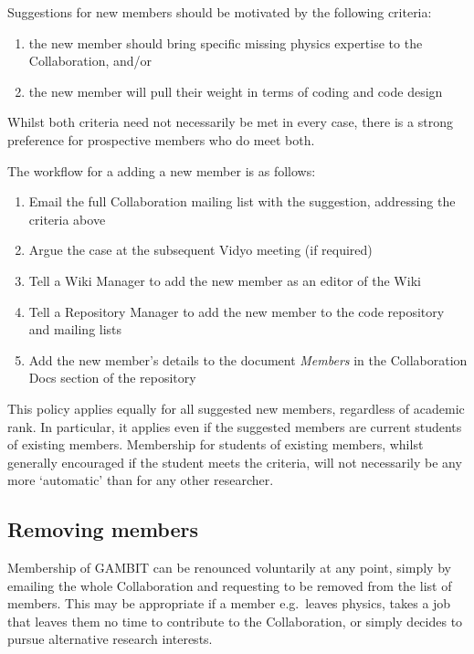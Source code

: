 Suggestions for new members should be motivated by the following criteria:
\begin{enumerate}
\item the new member should bring specific missing physics expertise to the Collaboration, and/or
\item the new member will pull their weight in terms of coding and code design
\end{enumerate}
Whilst both criteria need not necessarily be met in every case, there is a strong preference for prospective members who do meet both.  

The workflow for a adding a new member is as follows:
\begin{enumerate}
\item Email the full Collaboration mailing list with the suggestion, addressing the criteria above
\item Argue the case at the subsequent Vidyo meeting (if required)
\item Tell a Wiki Manager to add the new member as an editor of the Wiki
\item Tell a Repository Manager to add the new member to the code repository and mailing lists
\item Add the new member's details to the document \textit{Members} in the Collaboration Docs section of the repository
\end{enumerate}

This policy applies equally for all suggested new members, regardless of academic rank.  In particular, it applies even if the suggested members are current students of existing members.  Membership for students of existing members, whilst generally encouraged if the student meets the criteria, will not necessarily be any more `automatic' than for any other researcher.

\subsection{Removing members}

Membership of GAMBIT can be renounced voluntarily at any point, simply by emailing the whole Collaboration and requesting to be removed from the list of members.  This may be appropriate if a member e.g.\ leaves physics, takes a job that leaves them no time to contribute to the Collaboration, or simply decides to pursue alternative research interests.

